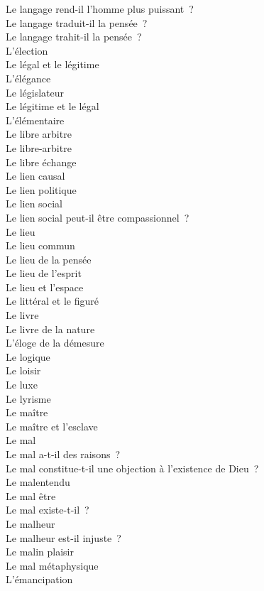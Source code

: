 \documentclass[a4paper,12pt]{article}
\begin{document}
Le langage rend-il l'homme plus puissant ? \\
Le langage traduit-il la pensée ? \\
Le langage trahit-il la pensée ? \\
L'élection \\
Le légal et le légitime \\
L'élégance \\
Le législateur \\
Le légitime et le légal \\
L'élémentaire \\
Le libre arbitre \\
Le libre-arbitre \\
Le libre échange \\
Le lien causal \\
Le lien politique \\
Le lien social \\
Le lien social peut-il être compassionnel ? \\
Le lieu \\
Le lieu commun \\
Le lieu de la pensée \\
Le lieu de l'esprit \\
Le lieu et l'espace \\
Le littéral et le figuré \\
Le livre \\
Le livre de la nature \\
L'éloge de la démesure \\
Le logique \\
Le loisir \\
Le luxe \\
Le lyrisme \\
Le maître \\
Le maître et l'esclave \\
Le mal \\
Le mal a-t-il des raisons ? \\
Le mal constitue-t-il une objection à l'existence de Dieu ? \\
Le malentendu \\
Le mal être \\
Le mal existe-t-il ? \\
Le malheur \\
Le malheur est-il injuste ? \\
Le malin plaisir \\
Le mal métaphysique \\
L'émancipation \\
\end{document}
